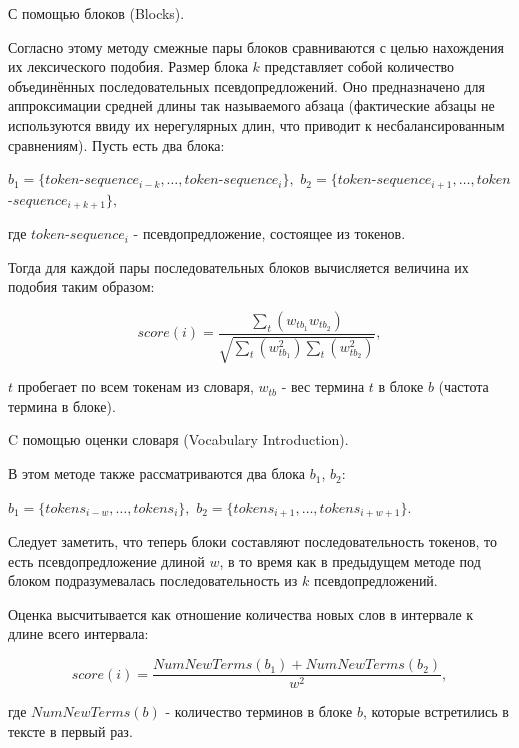 \documentclass[14pt]{matmex-diploma-custom}
\begin{document}
\par\begin{itemize}{
		\item С помощью блоков (Blocks).
		
		Согласно этому методу смежные пары блоков сравниваются с целью нахождения их лексического подобия. Размер блока $k$ представляет собой количество объединённых последовательных псевдопредложений. Оно предназначено для аппроксимации средней длины так называемого абзаца (фактические абзацы не используются ввиду их нерегулярных длин, что приводит к несбалансированным сравнениям). Пусть есть два блока:
		
		\begin{center}
			$b_1 = \{token$-$sequence_{i-k}, \ldots, token$-$sequence_i\},$ 
			$b_2 = \{token$-$sequence_{i+1}, \ldots, token$-$sequence_{i+k+1}\},$ 
		\end{center}
		\noindent где $token$-$sequence_i$ - псевдопредложение, состоящее из токенов.
		
		Тогда для каждой пары последовательных блоков вычисляется величина их подобия таким образом: 
		
		$$score(i) = \frac{\sum_{t}(w_{tb_1}w_{tb_2})}{\sqrt{\sum_{t}(w_{tb_1}^2)\sum_{t}(w_{tb_2}^2)}},$$
		
		$t$ пробегает по всем токенам из словаря, $w_{tb}$ - вес термина $t$ в блоке $b$ (частота термина в блоке).
		
		\vspace{0.2cm}\item C помощью оценки словаря (Vocabulary Introduction).	
		
		В этом методе также рассматриваются два блока $b_1$, $b_2$:
		
		\begin{center}
			$b_1 = \{tokens_{i-w}, \ldots, tokens_i\},$ 
			$b_2 = \{tokens_{i+1}, \ldots, tokens_{i+w+1}\}$. 
		\end{center}
		
		Следует заметить, что теперь блоки составляют последовательность токенов, то есть псевдопредложение длиной $w$, в то время как в предыдущем методе под блоком подразумевалась последовательность из $k$ псевдопредложений. 
		
		Оценка высчитывается как отношение количества новых слов в интервале к длине всего интервала:
		
		\begin{center}
			$$score(i) = \frac{NumNewTerms(b_1) + NumNewTerms(b_2)}{w^2},$$
		\end{center}
		\noindent где $NumNewTerms(b)$ - количество терминов в блоке $b$, которые встретились в тексте в первый раз.
}\end{itemize}
\end{document}
